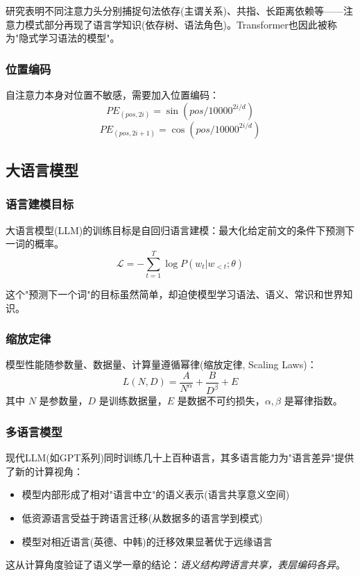 研究表明不同注意力头分别捕捉句法依存(主谓关系)、共指、长距离依赖等——注意力模式部分再现了语言学知识(依存树、语法角色)。Transformer也因此被称为"隐式学习语法的模型"。

\subsubsection{位置编码}

自注意力本身对位置不敏感，需要加入位置编码：
\begin{equation}
    PE_{(pos, 2i)} = \sin(pos / 10000^{2i/d})
\end{equation}
\begin{equation}
    PE_{(pos, 2i+1)} = \cos(pos / 10000^{2i/d})
\end{equation}

\subsection{大语言模型}

\subsubsection{语言建模目标}

大语言模型(LLM)的训练目标是自回归语言建模：最大化给定前文的条件下预测下一词的概率。
\begin{equation}
    \mathcal{L} = -\sum_{t=1}^{T} \log P(w_t | w_{<t}; \theta)
\end{equation}

这个"预测下一个词"的目标虽然简单，却迫使模型学习语法、语义、常识和世界知识。

\subsubsection{缩放定律}

模型性能随参数量、数据量、计算量遵循幂律(缩放定律, Scaling Laws)：
\begin{equation}
    L(N, D) = \frac{A}{N^\alpha} + \frac{B}{D^\beta} + E
\end{equation}
其中 $N$ 是参数量，$D$ 是训练数据量，$E$ 是数据不可约损失，$\alpha, \beta$ 是幂律指数。

\subsubsection{多语言模型}

现代LLM(如GPT系列)同时训练几十上百种语言，其多语言能力为"语言差异"提供了新的计算视角：
\begin{itemize}
    \item 模型内部形成了相对"语言中立"的语义表示(语言共享意义空间)
    \item 低资源语言受益于跨语言迁移(从数据多的语言学到模式)
    \item 模型对相近语言(英德、中韩)的迁移效果显著优于远缘语言
\end{itemize}
这从计算角度验证了语义学一章的结论：\emph{语义结构跨语言共享，表层编码各异}。

